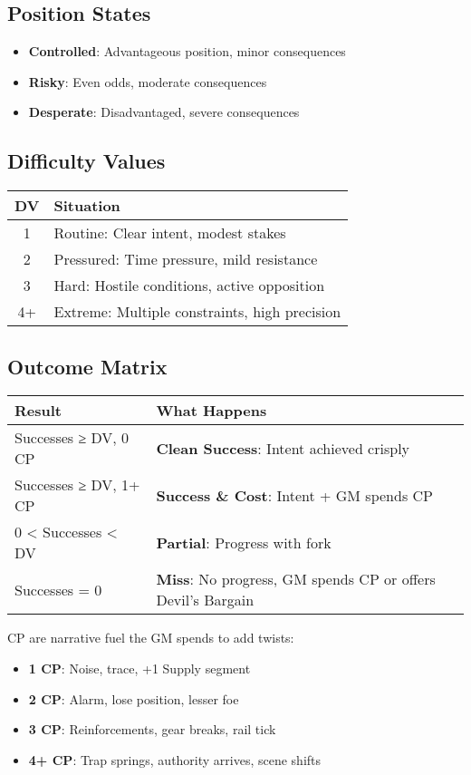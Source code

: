 \documentclass[11pt]{article}
\begin{document}
\subsection{Position States}
\begin{itemize}
    \item \textbf{Controlled}: Advantageous position, minor consequences
    \item \textbf{Risky}: Even odds, moderate consequences
    \item \textbf{Desperate}: Disadvantaged, severe consequences
\end{itemize}

\subsection{Difficulty Values}
\begin{center}
\begin{tabular}{cl}
\toprule
\textbf{DV} & \textbf{Situation} \\
\midrule
1 & Routine: Clear intent, modest stakes \\
2 & Pressured: Time pressure, mild resistance \\
3 & Hard: Hostile conditions, active opposition \\
4+ & Extreme: Multiple constraints, high precision \\
\bottomrule
\end{tabular}
\end{center}

\subsection{Outcome Matrix}
\begin{center}
\begin{tabular}{ll}
\toprule
\textbf{Result} & \textbf{What Happens} \\
\midrule
Successes ≥ DV, 0 CP & \textbf{Clean Success}: Intent achieved crisply \\
Successes ≥ DV, 1+ CP & \textbf{Success \& Cost}: Intent + GM spends CP \\
0 < Successes < DV & \textbf{Partial}: Progress with fork \\
Successes = 0 & \textbf{Miss}: No progress, GM spends CP or offers Devil's Bargain \\
\bottomrule
\end{tabular}
\end{center}

\begin{fatebox}
CP are narrative fuel the GM spends to add twists:
\begin{itemize}
    \item \textbf{1 CP}: Noise, trace, +1 Supply segment
    \item \textbf{2 CP}: Alarm, lose position, lesser foe
    \item \textbf{3 CP}: Reinforcements, gear breaks, rail tick
    \item \textbf{4+ CP}: Trap springs, authority arrives, scene shifts
\end{itemize}
\end{fatebox}
\end{document}
